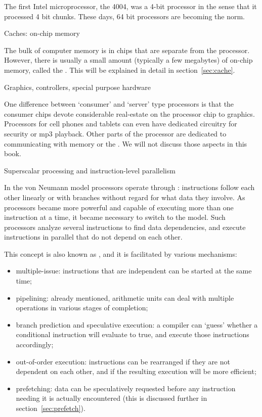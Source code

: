 The first Intel microprocessor, the 4004, was a 4-bit
processor in the sense that it processed 4 bit chunks. These days,
64 bit processors are becoming the norm.

 {Caches: on-chip memory}

The bulk of computer memory is in chips that are separate from the processor.
However, there is usually a small amount (typically a few megabytes)
of on-chip memory, called the . This will be 
explained in detail in section~\ref{sec:cache}.

 {Graphics, controllers, special purpose hardware}

One difference between `consumer' and `server' type processors
is that the consumer chips devote considerable real-estate
on the processor chip to graphics. Processors for cell phones and tablets
can even have dedicated circuitry for security or mp3 playback.
Other parts of the processor
are dedicated to communicating with memory or the .
We will not discuss those aspects in this book.

 {Superscalar processing and instruction-level parallelism}
\label{sec:pipelinecpu}

In the von Neumann model processors operate through :
instructions follow each other linearly or with branches without regard for what
data they involve. As processors became more powerful and capable of executing
more than one instruction at a time, it became necessary to switch to the
 model. Such  processors
analyze several instructions to find data dependencies, and execute
instructions in parallel that do not depend on each other.

This concept is also known as , and it is facilitated by
various mechanisms:
\begin{itemize}
\item multiple-issue: instructions that are independent can be started
  at the same time;
\item pipelining: already mentioned, arithmetic units can deal with
  multiple operations in various stages of completion;
\item branch prediction and speculative execution: a compiler can
  `guess' whether a conditional instruction will evaluate to true, and
  execute those instructions accordingly;
\item out-of-order execution: instructions can be rearranged if they
  are not dependent on each other, and if the resulting execution will
  be more efficient;
\item prefetching: data can be speculatively requested before any
  instruction needing it is actually encountered (this is discussed
  further in section~\ref{sec:prefetch}).
\end{itemize}

